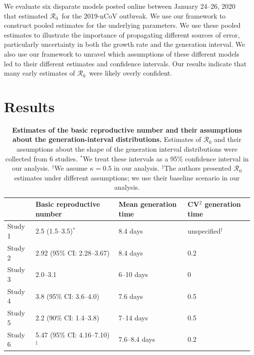 \documentclass[12pt]{article}
\newcommand{\Rx}[1]{\ensuremath{{\mathcal R}_{#1}}}
\newcommand{\Ro}{\Rx{0}}
\begin{document}
We evaluate six disparate models posted online between January 24--26, 2020 that estimated \Ro\ for the 2019-nCoV outbreak. We use our framework to construct pooled estimates for the underlying parameters. We use these pooled estimates to illustrate the importance of propagating different sources of error, particularly uncertainty in both the growth rate and the generation interval. We also use our framework to unravel which assumptions of these different models led to their different estimates and confidence intervals.
Our results indicate that many early estimates of \Ro\ were likely overly confident.

\section{Results}

\begin{table}[t]
\begin{center}
\footnotesize
\begin{tabular}{l|l|l|l}
 & Basic reproductive number & Mean generation time & CV$^2$ generation time \\
\hline
Study 1 & 2.5 (1.5--3.5)$^\ast$ & 8.4 days & unspecified$^\dagger$ \\
\hline
Study 2 & 2.92 (95\% CI: 2.28--3.67) & 8.4 days & 0.2 \\
\hline
Study 3 & 2.0--3.1 & 6--10 days & 0 \\
\hline
Study 4 & 3.8 (95\% CI: 3.6--4.0) & 7.6 days & 0.5 \\
\hline
Study 5 & 2.2 (90\% CI: 1.4--3.8) & 7--14 days & 0.5\\
\hline
Study 6 & 5.47 (95\% CI: 4.16--7.10)$^\ddagger$ & 7.6--8.4 days & 0.2\\
\hline
\end{tabular}
\end{center}
\caption{
\textbf{Estimates of the basic reproductive number and their assumptions about the generation-interval distributions.}
Estimates of $\mathcal R_0$ and their assumptions about the shape of the generation interval distributions were collected from 6 studies.
$^\ast$We treat these intervals as a 95\% confidence interval in our analysis.
$^\dagger$We assume $\kappa = 0.5$ in our analysis.
$^\ddagger$The authors presented $\mathcal R_0$ estimates under different assumptions; we use their baseline scenario in our analysis.
}
\end{table}
\end{document}
